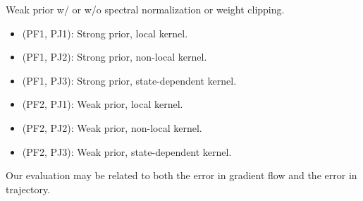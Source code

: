 \documentclass[11pt,a4paper]{article}
\theoremstyle{plain}
\theoremstyle{definition}
\theoremstyle{remark}
\begin{document}
\noindent
Weak prior w/ or w/o spectral normalization or weight clipping.

\begin{itemize}
	\item (PF1, PJ1): Strong prior, local kernel.
	\item (PF1, PJ2): Strong prior, non-local kernel.
	\item (PF1, PJ3): Strong prior, state-dependent kernel.
\end{itemize}

\begin{itemize}
	\item (PF2, PJ1): Weak prior, local kernel.
	\item (PF2, PJ2): Weak prior, non-local kernel.
	\item (PF2, PJ3): Weak prior, state-dependent kernel.
\end{itemize}


Our evaluation may be related to both the error in gradient flow and the error in trajectory.




\end{document}
